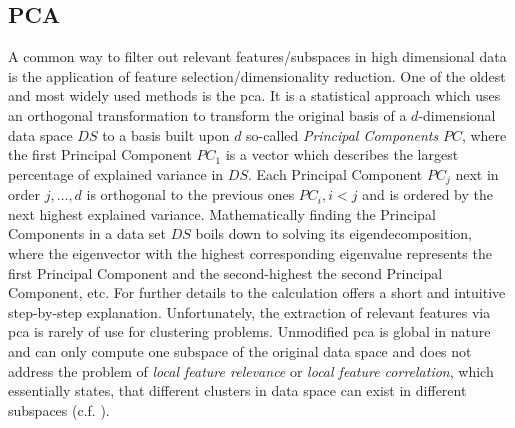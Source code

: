 \subsection{PCA}
A common way to filter out relevant features/subspaces in high dimensional data is the application of feature selection/dimensionality reduction. One of the oldest and most widely used methods is the \gls{pca}. It is a statistical approach which uses an orthogonal transformation to transform the original basis of a $d$-dimensional data space $DS$ to a basis built upon $d$ so-called \textit{Principal Components} $PC$, where the first Principal Component $PC_1$ is a vector which describes the largest percentage of explained variance in $DS$. Each Principal Component $PC_j$ next in order $j,\dotsc,d$ is orthogonal to the previous ones $PC_i, i<j$ and is ordered by the next highest explained variance. Mathematically finding the Principal Components in a data set $DS$ boils down to solving its eigendecomposition, 
where the eigenvector with the highest corresponding eigenvalue represents the first Principal Component and the second-highest the second Principal Component, etc\cite{pcawold1987principal}. For further details to the calculation \textcite{pcamljolliffe1986principal} offers a short and intuitive step-by-step explanation.
Unfortunately, the extraction of relevant features via \gls{pca} is rarely of use for clustering problems. Unmodified \gls{pca} is global in nature and can only compute one subspace of the original data space and does not address the problem of \textit{local feature relevance} or \textit{local feature correlation}, which essentially states, that different clusters in data space can exist in different subspaces\cite{kriegel2009clustering} (c.f. \cite{PCAshlens2014tutorial}). 

